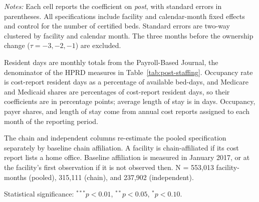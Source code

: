 \documentclass[11pt]{article}
\begin{document}
\begin{table}[!ht]
\begin{threeparttable}
\begin{tablenotes}[flushleft]
\footnotesize
\item \textit{Notes:} Each cell reports the coefficient on \textit{post}, with standard errors in parentheses. All specifications include facility and calendar-month fixed effects and control for the number of certified beds. Standard errors are two-way clustered by facility and calendar month. The three months before the ownership change ($\tau = -3, -2, -1$) are excluded.
\item Resident days are monthly totals from the Payroll-Based Journal, the denominator of the HPRD measures in Table~\ref{tab:post-staffing}. Occupancy rate is cost-report resident days as a percentage of available bed-days, and Medicare and Medicaid shares are percentages of cost-report resident days, so their coefficients are in percentage points; average length of stay is in days. Occupancy, payer shares, and length of stay come from annual cost reports assigned to each month of the reporting period.
\item The chain and independent columns re-estimate the pooled specification separately by baseline chain affiliation. A facility is chain-affiliated if its cost report lists a home office. Baseline affiliation is measured in January 2017, or at the facility's first observation if it is not observed then. N = 553,013 facility-months (pooled), 315,111 (chain), and 237,902 (independent).
\item Statistical significance: $^{***}p<0.01$, $^{**}p<0.05$, $^{*}p<0.10$.
\end{tablenotes}

\end{threeparttable}
\end{table}
\clearpage
\end{document}
